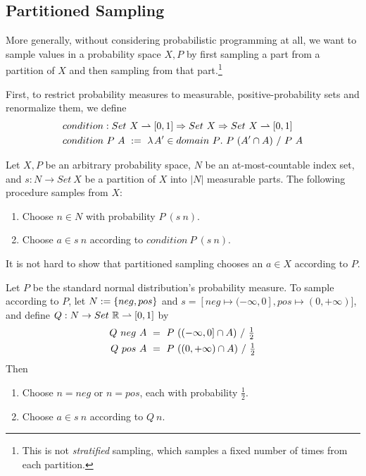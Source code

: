 \subsection{Partitioned Sampling}

More generally, without considering probabilistic programming at all, we want to sample values in a probability space $X,P$ by first sampling a part from a partition of $X$ and then sampling from that part.\footnote{This is not \emph{stratified} sampling, which samples a fixed number of times from each partition.}

First, to restrict probability measures to measurable, positive-probability sets and renormalize them, we define
\begin{equation}
\begin{aligned}
	&condition : Set~X \rightharpoonup [0,1] \Rightarrow Set~X \Rightarrow Set~X \rightharpoonup [0,1] \\
	&condition~P~A\ :=\ \lambda\mspace{2mu}{A' \in domain~P}\ldotp\, P~(A' \cap A)~{/}~P~A
\end{aligned}
\end{equation}

\begin{definition}
\label{def:partitioned-sampling}
Let $X,P$ be an arbitrary probability space, $N$ be an at-most-countable index set, and $s : N \to Set~X$ be a partition of $X$ into $|N|$ measurable parts. The following procedure samples from $X$:
\begin{enumerate}
	\item Choose $n \in N$ with probability $P~(s~n)$.
	\item Choose $a \in s~n$ according to $condition~P~(s~n)$.
\end{enumerate}
\end{definition}

It is not hard to show that partitioned sampling chooses an $a \in X$ according to $P$.

\begin{example}
\label{ex:partitioned-sampling}
Let $P$ be the standard normal distribution's probability measure.
To sample according to $P$, let $N := \{{neg,pos}\}$ and $s = [neg \mapsto (-\infty,0], pos \mapsto (0,+\infty)]$, and define $Q : N \to Set~\mathbb{R} \rightharpoonup [0,1]$ by
\begin{equation}
\begin{aligned}
	Q~neg~A\ &=\ P~((-\infty,0] \cap A)~{/}~\tfrac{1}{2} \\
	Q~pos~A\ &=\ P~((0,+\infty) \cap A)~{/}~\tfrac{1}{2}
\end{aligned}
\end{equation}
Then
\begin{enumerate}
	\item Choose $n = neg$ or $n = pos$, each with probability $\frac{1}{2}$.
	\item Choose $a \in s~n$ according to $Q~n$.\exampleqed
\end{enumerate}
\end{example}

